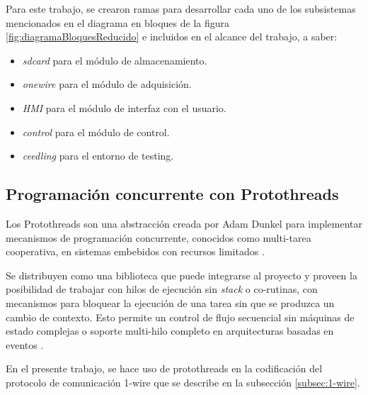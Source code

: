 Para este trabajo, se crearon ramas para desarrollar cada uno de los subsistemas mencionados en el diagrama en bloques de la figura \ref{fig:diagramaBloquesReducido} e incluidos en el alcance del trabajo, a saber:

\begin{itemize}
	\item \textit{sdcard} para el módulo de almacenamiento.
	\item \textit{onewire} para el módulo de adquisición.
	\item \textit{HMI} para el módulo de interfaz con el usuario.
	\item \textit{control} para el módulo de control.
	\item \textit{ceedling} para el entorno de testing.
\end{itemize}  



\subsection{Programación concurrente con Protothreads} 
\label{subsec:protothreads}

Los Protothreads son una abstracción creada por Adam Dunkel para implementar mecanismos de programación concurrente, conocidos como multi-tarea cooperativa, en sistemas embebidos con recursos limitados \citep{Protothreads}. 

Se distribuyen como una biblioteca que puede integrarse al proyecto y proveen la posibilidad de trabajar con hilos de ejecución sin \textit{stack} o co-rutinas, con mecanismos para bloquear la ejecución de una tarea sin que se produzca un cambio de contexto.  Esto permite un control de flujo secuencial sin máquinas de estado complejas o soporte multi-hilo completo en arquitecturas basadas en eventos \citep{dunkels06protothreads} \citep{dunkels05using}. 

En el presente trabajo, se hace uso de protothreads en la codificación del protocolo de comunicación 1-wire que se describe en la subsección \ref{subsec:1-wire}.